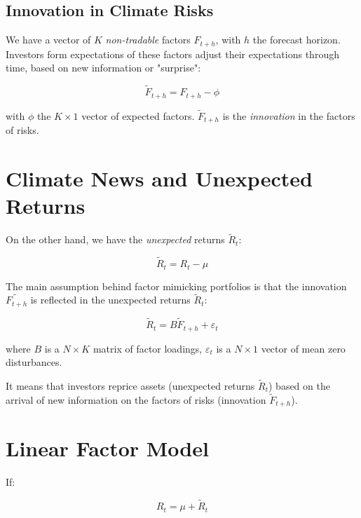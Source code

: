 \subsection{Innovation in Climate Risks}


We have a vector of $K$ \textit{non-tradable} factors $F_{t+h}$, with $h$ the 
forecast horizon. 
Investors form expectations of these factors 
adjust their expectations through time, based on new information or 
"surprise":

\begin{equation}
    \tilde{F}_{t+h} = F_{t+h} - \phi
\end{equation}

with $\phi$ the $K \times 1$ vector of expected factors.
$\tilde{F}_{t+h}$ is the \textit{innovation} in the factors of risks.




\section{Climate News and Unexpected Returns}

On the other hand, we have the \textit{unexpected} returns $\tilde{R}_t$:

\begin{equation}
    \tilde{R}_t = R_t - \mu
\end{equation}

The main assumption behind factor mimicking portfolios is that the innovation 
$\tilde{F_{t+h}}$ is reflected in the unexpected returns $\tilde{R}_t$:

\begin{equation}
    \tilde{R}_t = B \tilde{F}_{t+h} + \varepsilon_t
\end{equation}
    
where $B$ is a $N \times K$ matrix of factor loadings, $\varepsilon_t$ is a $N \times 1$ vector of mean zero disturbances.

It means that investors reprice assets (unexpected returns $\tilde{R}_t$) based on the arrival of new information on the factors of risks (innovation $\tilde{F}_{t+h}$).


\section{Linear Factor Model}

If:

\begin{equation}
    R_t = \mu + \tilde{R}_t
\end{equation}

